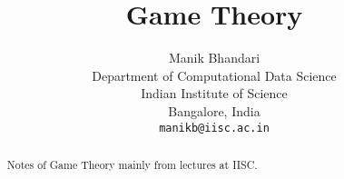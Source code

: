 \documentclass{article}
\title{Game Theory}
\author{
	Manik Bhandari\\
	Department of Computational Data Science\\
	Indian Institute of Science\\
	Bangalore, India \\
	\texttt{manikb@iisc.ac.in} \\
}
\begin{document}
	
	\maketitle
	
	\begin{abstract}
		Notes of Game Theory mainly from lectures at IISC.
	\end{abstract}
	





	
	
\end{document}
